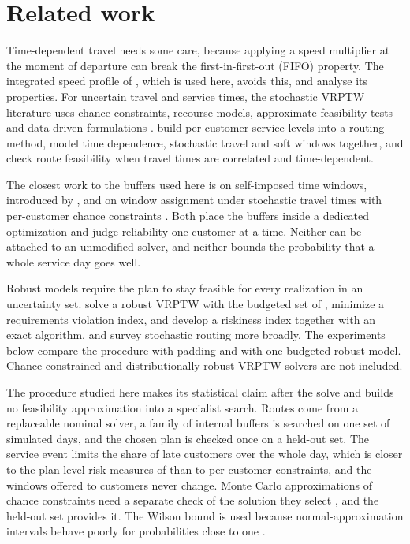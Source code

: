 \documentclass{itor}
\begin{document}
\section{Related work}\label{sec:related}

Time-dependent travel needs some care, because applying a speed multiplier at
the moment of departure can break the first-in-first-out (FIFO) property. The
integrated speed profile of \citet{ichoua2003}, which is used here, avoids this,
and \citet{ghiani2014} analyse its properties. For uncertain travel and service
times, the stochastic VRPTW literature uses chance constraints, recourse models,
approximate feasibility tests and data-driven formulations
\citep{laporte1992,kenyon2003,li2010,errico2018,bomboi2022,serrano2026}.
\citet{ehmke2015} build per-customer service levels into a routing method,
\citet{tas2014} model time dependence, stochastic travel and soft windows
together, and \citet{bomboi2022} check route feasibility when travel times are
correlated and time-dependent.

The closest work to the buffers used here is on self-imposed time windows,
introduced by \citet{jabali2015}, and on window assignment under stochastic
travel times with per-customer chance constraints \citep{vareias2019}. Both
place the buffers inside a dedicated optimization and judge reliability one
customer at a time. Neither can be attached to an unmodified solver, and neither
bounds the probability that a whole service day goes well.

Robust models require the plan to stay feasible for every realization in an
uncertainty set. \citet{agra2013} solve a robust VRPTW with the budgeted set of
\citet{bertsimas2004}, \citet{jaillet2016} minimize a requirements violation
index, and \citet{zhang2019} develop a riskiness index together with an exact
algorithm. \citet{gendreau1996} and \citet{gendreau2016} survey stochastic
routing more broadly. The experiments below compare the procedure with padding
and with one budgeted robust model. Chance-constrained and distributionally
robust VRPTW solvers are not included.

The procedure studied here makes its statistical claim after the solve and
builds no feasibility approximation into a specialist search. Routes come from a replaceable nominal solver, a family of internal buffers is searched
on one set of simulated days, and the chosen plan is checked once on a held-out
set. The service event limits the share of late customers over the whole day,
which is closer to the plan-level risk measures of \citet{kenyon2003} than to
per-customer constraints, and the windows offered to customers never change.
Monte Carlo approximations of chance constraints need a separate check of the
solution they select \citep{ahmed2008}, and the held-out set provides it. The
Wilson bound is used because normal-approximation intervals behave poorly for
probabilities close to one \citep{wilson1927,brown2001}.
\end{document}
